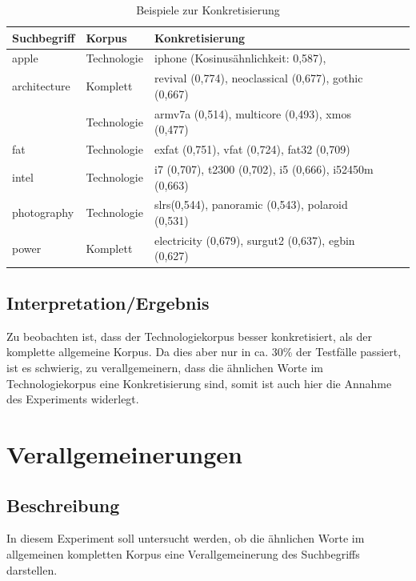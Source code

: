 \documentclass[12pt,a4paper]{report}
\begin{document}
\begin{table}[H]
\caption{Beispiele zur Konkretisierung}
\begin{center}
\begin{tabular}{|l||l|l|l|l|}
\hline
Suchbegriff & Korpus & Konkretisierung   \\

\hline
 apple & Technologie & iphone (Kosinusähnlichkeit: 0,587),\\
 \hline
 architecture	   & Komplett & revival (0,774), neoclassical (0,677), gothic (0,667) \\
 & Technologie& armv7a (0,514), multicore (0,493), xmos (0,477) \\
\hline
 fat	& Technologie	& exfat (0,751), vfat (0,724), fat32 (0,709)	\\
 	\hline
 intel	 & Technologie& i7 (0,707), t2300 (0,702), i5 (0,666), i52450m (0,663) \\
 \hline
 photography	& Technologie& slrs(0,544), panoramic (0,543), polaroid (0,531)\\
 	\hline
 power	&	Komplett &	electricity (0,679), surgut2 (0,637), egbin (0,627) \\
 	\hline
 
\end{tabular}
\end{center}
\end{table}
		
		
		\subsection{Interpretation/Ergebnis}
		Zu beobachten ist, dass der Technologiekorpus besser konkretisiert, als der komplette allgemeine Korpus. Da dies aber nur in ca. 30\% der Testfälle passiert, ist es schwierig, zu verallgemeinern, dass die ähnlichen Worte im Technologiekorpus eine Konkretisierung sind, somit ist auch hier die Annahme des Experiments widerlegt.
		
		
	
	\section{Verallgemeinerungen}
		\subsection{Beschreibung}
		In diesem Experiment soll untersucht werden, ob die ähnlichen Worte im allgemeinen kompletten Korpus eine Verallgemeinerung des Suchbegriffs darstellen.\\
		
\end{document}
